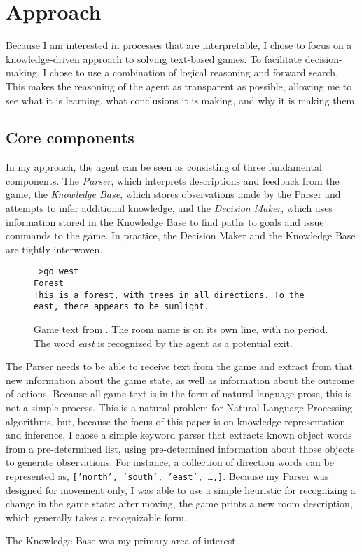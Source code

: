 \section{Approach}

Because I am interested in processes that are interpretable, I chose to
focus on a knowledge-driven approach to solving text-based games. To
facilitate decision-making, I chose to use a combination of logical
reasoning and forward search. This makes the reasoning of the agent as
transparent as possible, allowing me to see what it is learning, what
conclusions it is making, and why it is making them.

\subsection{Core components}

In my approach, the agent can be seen as consisting of three fundamental
components. The \emph{Parser}, which interprets descriptions and
feedback from the game, the \emph{Knowledge Base}, which stores
observations made by the Parser and attempts to infer additional
knowledge, and the \emph{Decision Maker}, which uses information stored
in the Knowledge Base to find paths to goals and issue commands to the
game. In practice, the Decision Maker and the Knowledge Base are tightly
interwoven.

\begin{wrapfigure}{R}{.45\textwidth}
    \raggedright
    \texttt{
        >go west\\
        Forest\\
        This is a forest, with trees in all directions. To the east,
    there appears to be sunlight.}

    \caption{\small Game text from . The room
    name is on its own line, with no period. The word \emph{east} is
recognized by the agent as a potential exit.}
\end{wrapfigure}

The Parser needs to be able to receive text from the game and extract
from that new information about the game state, as well as information
about the outcome of actions. Because all game text is in the form of
natural language prose, this is not a simple process. This is a natural
problem for Natural Language Processing algorithms, but, because the
focus of this paper is on knowledge representation and inference, I
chose a simple keyword parser that extracts known object words from a
pre-determined list, using pre-determined information about those
objects to generate observations. For instance, a collection of
direction words can be represented as, \texttt{['north', 'south',
'east', \ldots,]}. Because my Parser was designed for movement only, I
was able to use a simple heuristic for recognizing a change in the game
state: after moving, the game prints a new room description, which
generally takes a recognizable form.

The Knowledge Base was my primary area of interest.
